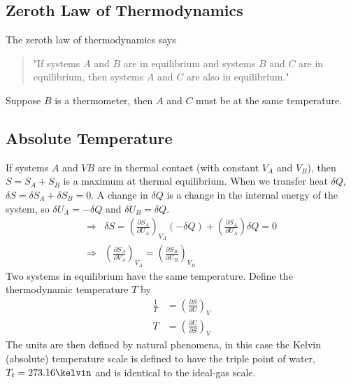 \documentclass[british]{article}
\newcommand{\pd}[2]{\frac{\partial #1}{\partial #2}} %
\begin{document}
\subsection{Zeroth Law of Thermodynamics}
The zeroth law of thermodynamics says
\begin{quote}
	"If systems $A$ and $B$ are in equilibrium and systems $B$ and $C$ are in equilibrium, then systems $A$ and $C$ are also in equilibrium."
\end{quote}
Suppose $B$ is a thermometer, then $A$ and $C$ must be at the same temperature.

\subsection{Absolute Temperature}
If systems $A$ and $VB$ are in thermal contact (with constant $V_A$ and $V_B$), then $S=S_A+S_B$ is a maximum at thermal equilibrium. When we transfer heat $\delta Q$, $\delta S = \delta S_A + \delta S_B=0$. A change in $\delta Q$ is a change in the internal energy of the system, so $\delta U_A = -\delta Q$ and $\delta U_B = \delta Q$.
\begin{align*}
	\Rightarrow& \delta S = \left( \pd{S_A}{U_A} \right)_{V_A} (-\delta Q) + \left(\pd{S_A}{U_A}\right)\delta Q=0 \\
	\Rightarrow& \left(\pd{S_A}{V_A} \right)_{V_A} = \left(\pd{S_B}{U_B} \right)_{V_B}
\end{align*}
Two systems in equilibrium have the same temperature. Define the thermodynamic temperature $T$ by
\begin{align*}
	\frac{1}{T} &= \left(\pd{S}{U}\right)_V \\
	T &= \left(\pd{U}{S}\right)_V
\end{align*}
The units are then defined by natural phenomena, in this case the Kelvin (absolute) temperature scale is defined to have the triple point of water, $T_t=273.16 \kelvin$ and is identical to the ideal-gas scale.
\end{document}

